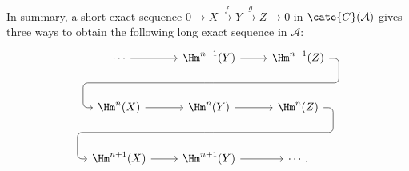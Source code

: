 In summary, a short exact sequence
$0\to X\xrightarrow{f}Y\xrightarrow{g}Z\to0$ in
$\cate{C}(\mathcal{A})$ gives three ways to obtain the following long exact
sequence in $\mathcal{A}$:
\[\begin{tikzcd}[row sep=large]
	\cdots \arrow[r] & \Hm^{n-1}(Y) \arrow[r] \arrow[phantom, d, ""{coordinate, name=A}] & \Hm^{n-1}(Z) \arrow[dll, rounded corners, to path={
		-- ([xshift=2ex]\tikztostart.east)
		|- (A) [near end]\tikztonodes
		-| ([xshift=-2ex]\tikztotarget.west)
		-- (\tikztotarget)}] \\
	\Hm^n(X) \arrow[r] & \Hm^n(Y) \arrow[r] \arrow[phantom, d, ""{coordinate, name=B}] & \Hm^n(Z) \arrow[dll, rounded corners, to path={
		-- ([xshift=2ex]\tikztostart.east)
		|- (B) [near end]\tikztonodes
		-| ([xshift=-2ex]\tikztotarget.west)
		-- (\tikztotarget)}] \\
	\Hm^{n+1}(X) \arrow[r] & \Hm^{n+1}(Y) \arrow[r] & \cdots .
\end{tikzcd}\]
